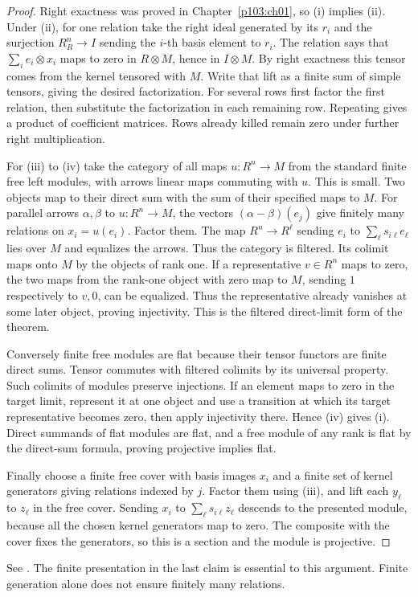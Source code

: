 \documentclass[11pt,oneside,openany]{book}
\theoremstyle{definition}
\theoremstyle{remark}
\begin{document}
\begin{proof}
Right exactness was proved in Chapter~\ref{p103:ch01}, so (i)
implies (ii). Under (ii), for one relation take the right ideal
generated by its \(r_i\) and the surjection \(R^n_R\to I\)
sending the \(i\)-th basis element to \(r_i\). The relation says
that \(\sum_i e_i\otimes x_i\) maps to zero in \(R\otimes M\),
hence in \(I\otimes M\). By right exactness this tensor comes from
the kernel tensored with \(M\). Write that lift as a finite sum of
simple tensors, giving the desired factorization. For several
rows first factor the first relation, then substitute the
factorization in each remaining row. Repeating gives a product of
coefficient matrices. Rows already killed remain zero under
further right multiplication.

For (iii) to (iv) take the category of all maps \(u:R^n\to M\)
from the standard finite free left modules, with arrows linear
maps commuting with \(u\). This is small. Two objects map to
their direct sum with the sum of their specified maps to \(M\).
For parallel arrows \(\alpha,\beta\) to \(u:R^n\to M\), the
vectors \((\alpha-\beta)(e_j)\) give finitely many relations on
\(x_i=u(e_i)\). Factor them. The map \(R^n\to R^\ell\) sending
\(e_i\) to \(\sum_\ell s_{i\ell}e_\ell\) lies over \(M\) and
equalizes the arrows. Thus the category is filtered. Its colimit
maps onto \(M\) by the objects of rank one. If a representative
\(v\in R^n\) maps to zero, the two maps from the rank-one object
with zero map to \(M\), sending \(1\) respectively to \(v,0\),
can be equalized. Thus the representative already vanishes at
some later object, proving injectivity. This is the filtered
direct-limit form of the theorem.

Conversely finite free modules are flat because their tensor
functors are finite direct sums. Tensor commutes with filtered
colimits by its universal property. Such colimits of modules
preserve injections. If an element maps to zero in the target
limit, represent it at one object and use a transition at which
its target representative becomes zero, then apply injectivity
there. Hence (iv) gives (i). Direct summands of flat modules are
flat, and a free module of any rank is flat by the direct-sum
formula, proving projective implies flat.

Finally choose a finite free cover with basis images \(x_i\) and
a finite set of kernel generators giving relations indexed by \(j\).
Factor them using (iii), and lift each \(y_\ell\) to \(z_\ell\) in
the free cover. Sending \(x_i\) to \(\sum_\ell s_{i\ell}z_\ell\)
descends to the presented module, because all the chosen kernel
generators map to zero. The composite with the cover fixes the
generators, so this is a section and the module is projective.
\end{proof}
See \cite[Theorems 4.12, 4.24, 4.30, and 4.34]{lam}. The finite
presentation in the last claim is essential to this argument.
Finite generation alone does not ensure finitely many relations.
\end{document}
